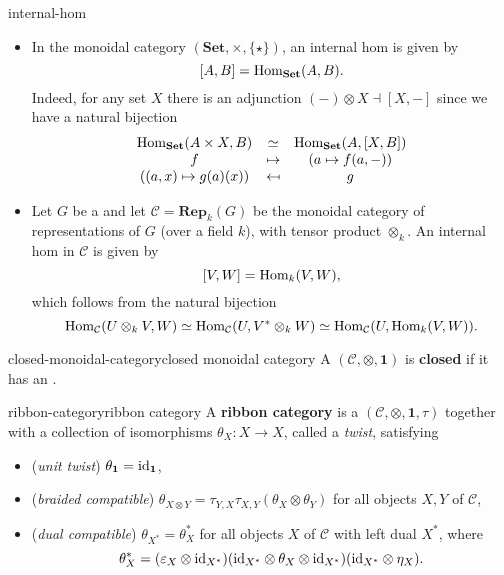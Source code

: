 \begin{example}{internal-hom}
    \begin{itemize}
        \item In the monoidal category $(\textbf{Set}, \times, \{ \star \})$, an internal hom is given by
        \[ [A, B] = \text{Hom}_\textbf{Set}(A, B) . \]
        Indeed, for any set $X$ there is an adjunction $(-) \otimes X \dashv {[X, -]}$ since we have a natural bijection
        \[ \begin{array}{ccc}
            \text{Hom}_\textbf{Set}(A \times X, B) & \simeq & \text{Hom}_\textbf{Set}(A, [X, B]) \\
            f & \mapsto & (a \mapsto f(a, -)) \\
            ((a, x) \mapsto g(a)(x)) & \mapsfrom & g
        \end{array} \]
        \item Let $G$ be a  and let $\mathcal{C} = \textbf{Rep}_k(G)$ be the monoidal category of representations of $G$ (over a field $k$), with tensor product $\otimes_k$. An internal hom in $\mathcal{C}$ is given by
        \[ [V, W] = \text{Hom}_{k}(V, W) , \]
        which follows from the natural bijection
        \[ \text{Hom}_\mathcal{C}(U \otimes_k V, W) \simeq \text{Hom}_\mathcal{C}(U, V^* \otimes_k W) \simeq \text{Hom}_\mathcal{C}(U, \text{Hom}_k(V, W)) . \]
    \end{itemize}
\end{example}

\begin{topic}{closed-monoidal-category}{closed monoidal category}
    A   $(\mathcal{C}, \otimes, \textbf{1})$ is \textbf{closed} if it has an .
\end{topic}

\begin{topic}{ribbon-category}{ribbon category}
    A \textbf{ribbon category} is a   $(\mathcal{C}, \otimes, \textbf{1}, \tau)$ together with a collection of isomorphisms $\theta_X : X \to X$, called a \textit{twist}, satisfying
    \begin{itemize}
        \item (\textit{unit twist}) $\theta_\textbf{1} = \text{id}_\textbf{1}$,
        \item (\textit{braided compatible}) $\theta_{X \otimes Y} = \tau_{Y, X} \tau_{X, Y} (\theta_X \otimes \theta_Y)$ for all objects $X, Y$ of $\mathcal{C}$,
        \item (\textit{dual compatible}) $\theta_{X^*} = \theta_X^*$ for all objects $X$ of $\mathcal{C}$ with left dual $X^*$, where
        \[ \theta_X^* = (\varepsilon_X \otimes \text{id}_{X^*}) (\text{id}_{X^*} \otimes \theta_X \otimes \text{id}_{X^*}) (\text{id}_{X^*} \otimes \eta_X) . \]
    \end{itemize}
\end{topic}

